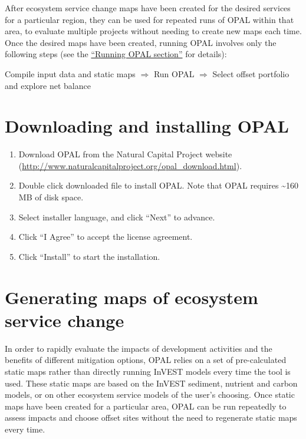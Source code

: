 \documentclass[11pt,letterpaper]{report}
\begin{document}
	After ecosystem service change maps have been created for the desired services for a particular region, they can be used for repeated runs of OPAL within that area, to evaluate multiple projects without needing to create new maps each time. Once the desired maps have been created, running OPAL involves only the following steps (see the \hyperref[ch:runningOPAL]{``Running OPAL section''} for details):
	
	\begin{center}
		{\sffamily Compile input data and static maps $\Rightarrow$ Run OPAL $\Rightarrow$ Select offset portfolio and explore net balance}
	\end{center}


\chapter{Downloading and installing OPAL}

	\begin{enumerate} 
		\item Download OPAL from the Natural Capital Project website (\url{http://www.naturalcapitalproject.org/opal_download.html}). 
		
		\item Double click downloaded file to install OPAL. Note that OPAL requires \~{}160 MB of disk space.
		
		\item Select installer language, and click ``Next'' to advance.
		
		\item Click ``I Agree'' to accept the license agreement.
		
		\item Click ``Install'' to start the installation.
	 \end{enumerate}

\chapter{Generating maps of ecosystem service change}
\label{ch:maps}

	In order to rapidly evaluate the impacts of development activities and the benefits of different mitigation options, OPAL relies on a set of pre-calculated static maps rather than directly running InVEST models every time the tool is used. These static maps are based on the InVEST sediment, nutrient and carbon models, or on other ecosystem service models of the user's choosing. Once static maps have been created for a particular area, OPAL can be run repeatedly to assess impacts and choose offset sites without the need to regenerate static maps every time.
	
\end{document}
